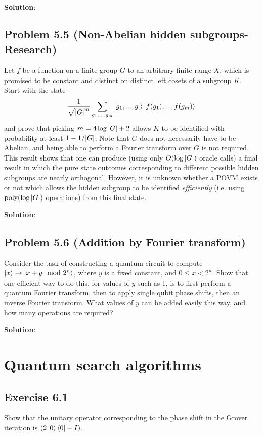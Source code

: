 \documentclass{book}
\begin{document}
    \textbf{Solution}:

\section*{Problem 5.5 (Non-Abelian hidden subgroups- Research)}
    Let $f$ be a function on a finite group $G$ to an arbitrary finite range $X$, which is promised to be constant and distinct on distinct left cosets of a subgroup $K$. Start with the state
    \begin{align}
        \frac{1}{\sqrt{\abs{G}^m}} \sum_{g_1,...,g_m}\ket{g_1,...,g_,}\ket{f(g_1),...,f(g_m)}
    \end{align}
    and prove that picking $m=4\log\abs{G}+2$ allows $K$ to be identified with probability at least $1-1/\abs{G}$. Note that $G$ does not necessarily have to be Abelian, and being able to perform a Fourier transform over $G$ is not required. This result shows that one can produce (using only $O(\log\abs{G})$ oracle calls) a final result in which the pure state outcomes corresponding to different possible hidden subgroups are nearly orthogonal. However, it is unknown whether a POVM exists or not which allows the hidden subgroup to be identified \emph{efficiently} (i.e. using $\text{poly}(\log\abs{G})$ operations) from this final state.
    
    \textbf{Solution}:

\section*{Problem 5.6 (Addition by Fourier transform)}
    Consider the task of constructing a quantum circuit to compute $\ket{x}\rightarrow \ket{x +y \mod 2^n}$, where $y$ is a fixed constant, and $0\leq x < 2^n$. Show that one efficient way to do this, for values of $y$ such as 1, is to first perform a quantum Fourier transform, then to apply single qubit phase shifts, then an inverse Fourier transform. What values of $y$ can be added easily this way, and how many operations are required?
    
    \textbf{Solution}:

\chapter{Quantum search algorithms}

\section*{Exercise 6.1} 
    Show that the unitary operator corresponding to the phase shift in the Grover iteration is $(2\ket{0}\bra{0}-I)$.
    
\end{document}
